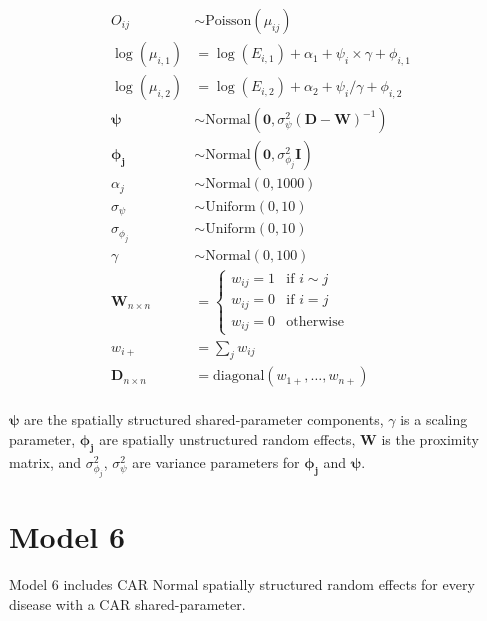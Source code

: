 \documentclass[10pt,letterpaper]{article}
\begin{document}
\begin{align*}
O_{ij}         &\sim   \mbox{Poisson}(\mu_{ij})\\
\log(\mu_{i,1}) &=      \log(E_{i,1}) + \alpha_{1} + \psi_{i} \times \gamma + \phi_{i,1}\\
\log(\mu_{i,2}) &=      \log(E_{i,2}) + \alpha_{2} + \psi_{i} / \gamma      + \phi_{i,2}\\
\boldsymbol{\psi}    &\sim   \mbox{Normal}(\mathbf{0}, \sigma^{2}_{\psi}(\boldsymbol{D}-\boldsymbol{W})^{-1})\\ 
\boldsymbol{\phi_{j}}        &\sim   \mbox{Normal}(\mathbf{0}, \sigma^{2}_{\phi_{j}}\mathbf{I})\\
\alpha_{j}    &\sim   \mbox{Normal}(0,1000)\\
\sigma_{\psi}     &\sim \mbox{Uniform}(0, 10)\\
\sigma_{\phi_{j}} &\sim \mbox{Uniform}(0, 10)\\
\gamma            &\sim   \mbox{Normal}(0,100)\\
\boldsymbol{W}_{n \times n} &=
\left\{
\begin{array}{rl}
w_{ij} = 1 & \mbox{if } i \sim j \\
w_{ij} = 0 & \mbox{if } i = j    \\
w_{ij} = 0 & \mbox{otherwise}   
\end{array}
\right.\\
w_{i+}                      &=\sum_{j} w_{ij}\\
\boldsymbol{D}_{n \times n} &=\mbox{diagonal}(w_{1+},\dots,w_{n+})\\
\end{align*}

$\boldsymbol{\psi}$ are the spatially structured shared-parameter components, $\gamma$ is a scaling parameter, $\boldsymbol{\phi_{j}}$ are spatially unstructured random effects, $\boldsymbol{W}$ is the proximity matrix, and $\sigma^{2}_{\phi_{j}}$, $\sigma^{2}_{\psi}$ are variance parameters for $\boldsymbol{\phi_{j}}$ and $\boldsymbol{\psi}$.


\newpage

\section*{Model 6}
Model 6 includes CAR Normal spatially structured random effects for every disease with a CAR shared-parameter. 
\end{document}

